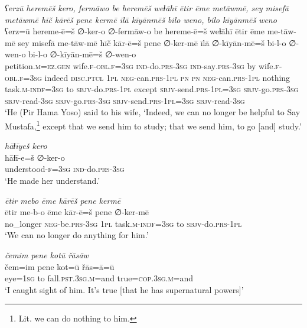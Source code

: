 \ea \label{ŽP.72}
\textit{ʕerzū heremēš kero, fermāwo be heremēš weɫāhī ētir ēme metāwmē, sey misefā metāwmē hīč kārēš pene kermē īlā kīyānmēš bilo weno, bilo kīyānmēš weno} \\ 
\gll ʕerz=ū hereme-ē=š ∅-ker-o ∅-fermāw-o be hereme-ē=š weɫāhī ētir ēme me-tāw-mē sey misefā me-tāw-mē hīč kār-ē=š pene ∅-ker-mē īlā ∅-kīyān-mē=š bi-l-o ∅-wen-o bi-l-o ∅-kīyān-mē=š ∅-wen-o \\ 
 petition\textsc{.m}\textsc{\textsc{=ez.gen}} wife\textsc{.f}\textsc{-obl}\textsc{.f}\textsc{=3sg} \textsc{ind-}do\textsc{.prs}\textsc{-3sg} \textsc{ind-}say\textsc{.prs}\textsc{-3sg} by wife\textsc{.f}\textsc{-obl}\textsc{.f}\textsc{=3sg} indeed \textsc{disc.ptcl} \textsc{1pl} \textsc{neg-}can\textsc{.prs}\textsc{-1pl} \textsc{pn} \textsc{pn} \textsc{neg-}can\textsc{.prs}\textsc{-1pl} nothing task\textsc{.m}\textsc{-indf}\textsc{=3sg} to \textsc{sbjv-}do\textsc{.prs}\textsc{-1pl} except \textsc{sbjv-}send\textsc{.prs}\textsc{-1pl}\textsc{=3sg} \textsc{sbjv-}go\textsc{.prs}\textsc{-3sg} \textsc{sbjv-}read\textsc{-3sg} \textsc{sbjv-}go\textsc{.prs}\textsc{-3sg} \textsc{sbjv-}send\textsc{.prs}\textsc{-1pl}\textsc{=3sg} \textsc{sbjv-}read\textsc{-3sg} \\ 
\glt `He (Pir Hama Yoso) said to his wife, ‘Indeed, we can no longer be helpful to Say Mustafa,\footnote{Lit. we can do nothing to him.} except that we send him to study; that we send him, to go [and] study.'
\z 
 
\ea \label{ŽP.73}
\textit{hāɫīyeš kero} \\ 
\gll hāɫī-e=š ∅-ker-o \\ 
 understood\textsc{-f}\textsc{=3sg} \textsc{ind-}do\textsc{.prs}\textsc{-3sg} \\ 
\glt `He made her understand.'
\z 
 
\ea \label{ŽP.75}
\textit{ētir mebo ēme kārēš pene kermē} \\ 
\gll ētir me-b-o ēme kār-ē=š pene ∅-ker-mē \\ 
 no\_longer \textsc{neg-}be\textsc{.prs}\textsc{-3sg} \textsc{1pl} task\textsc{.m}\textsc{-indf}\textsc{=3sg} to \textsc{sbjv-}do\textsc{.prs}\textsc{-1pl} \\ 
\glt `We can no longer do anything for him.'
\z 
 
\ea \label{ŽP.76}
\textit{čemim pene kotū řāsāw} \\ 
\gll čem=im pene kot=ū řās=ā=ū \\ 
 eye\textsc{=\textsc{1sg}} to fall\textsc{.pst}\textsc{.3sg}\textsc{.m}=and true\textsc{=cop}\textsc{.3sg}\textsc{.m}=and \\ 
\glt `I caught sight of him. It’s true [that he has supernatural powers]'
\z 
 
